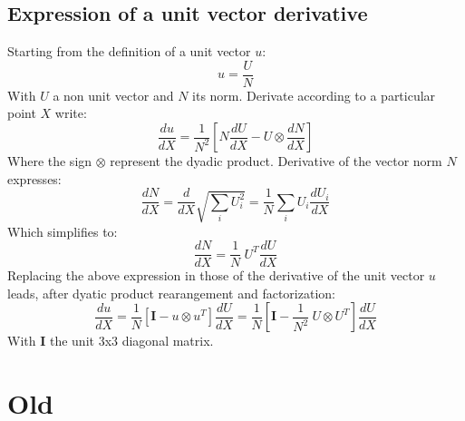 \documentclass[11pt]{article}
\begin{document}
\subsection{Expression of a unit vector derivative}
Starting from the definition of a unit vector $u$:
\begin{equation}
u = \frac{U}{N}
\end{equation}
With $U$ a non unit vector and $N$ its norm.
Derivate according to a particular point $X$ write:
\begin{equation}
\frac{du}{dX} = \frac{1}{N^2} \left[ N \frac{dU}{dX} - U \otimes \frac{dN}{dX} \right]
\end{equation}
Where the sign $\otimes$ represent the dyadic product. Derivative of the vector norm $N$ expresses:
\begin{equation}
\frac{dN}{dX} = \frac{d}{dX} \sqrt{\sum_i U_i^2} =
\frac{1}{N} \sum_i U_i \frac{dU_i}{dX}
\end{equation}
Which simplifies to:
\begin{equation}
\frac{dN}{dX} = \frac{1}{N}\ U^T \frac{dU}{dX}
\end{equation}
Replacing the above expression in those of the derivative of the unit vector $u$ leads, after dyatic product rearangement and factorization:
\begin{equation}
\frac{du}{dX} = \frac{1}{N} \left[ \boldsymbol{I} - u \otimes u^T \right] \frac{dU}{dX} = \frac{1}{N} \left[ \boldsymbol{I} - \frac{1}{N^2}\ U \otimes U^T \right] \frac{dU}{dX}
\end{equation}
With $\boldsymbol{I}$ the unit 3x3 diagonal matrix.





\section{Old}
\end{document}
